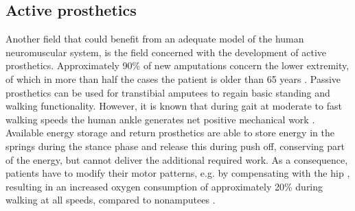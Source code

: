 

\subsection*{Active prosthetics}
Another field that could benefit from an adequate model of the human neuromuscular system, is the field concerned with the development of active prosthetics. Approximately 90\% of new amputations concern the lower extremity, of which in more than half the cases the patient is older than 65 years \cite{windrich_active_2016}. Passive prosthetics can be used for transtibial amputees to regain basic standing and walking functionality. However, it is known that during gait at moderate to fast walking speeds the human ankle generates net positive mechanical work \cite{gates_characterizing_2004}. Available energy storage and return prosthetics are able to store energy in the springs during the stance phase and release this during push off, conserving part of the energy, but cannot deliver the additional required work. As a consequence, patients have to modify their motor patterns, e.g. by compensating with the hip \cite{winter_biomechanics_1988}, resulting in an increased oxygen consumption of approximately 20\% during walking at all speeds, compared to nonamputees \cite{molen_energy/speed_1973}. 

